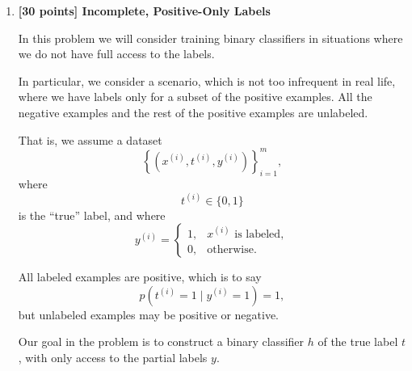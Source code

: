 \documentclass[10pt]{article}
\begin{document}
\begin{enumerate}
\begin{enumerate}[label=(\alph*)]
\item \textbf{[3 extra credit points]}

For the dataset where GDA performed worse in parts (f) and (g), can
you find a transformation of the $x^{(i)}$'s such that GDA performs
significantly better?

What is this transformation?

\medskip
\noindent\colorbox{yellow}{\textbf{Solution.}}

Box-Cox transformation: define 
\\
\[
\boxed{
T_\lambda(x)=
\begin{cases}
\displaystyle\frac{x^\lambda-1}{\lambda},
&\lambda\neq0,\\[10pt]
\log x,
&\lambda=0.
\end{cases}
}
\]

Note: we tempararily skip this part, and we'll come back later if we have more time

\end{enumerate}



\newpage 

\item \textbf{[30 points] Incomplete, Positive-Only Labels}

In this problem we will consider training binary classifiers in
situations where we do not have full access to the labels.

In particular, we consider a scenario, which is not too infrequent in
real life, where we have labels only for a subset of the positive
examples. All the negative examples and the rest of the positive
examples are unlabeled.

That is, we assume a dataset
\[
\left\{
(x^{(i)},t^{(i)},y^{(i)})
\right\}_{i=1}^{m},
\]
where
\[
t^{(i)}\in\{0,1\}
\]
is the ``true'' label, and where
\[
y^{(i)}
=
\begin{cases}
1, & x^{(i)}\text{ is labeled},\\
0, & \text{otherwise}.
\end{cases}
\]

All labeled examples are positive, which is to say
\[
p(t^{(i)}=1\mid y^{(i)}=1)=1,
\]
but unlabeled examples may be positive or negative.

Our goal in the problem is to construct a binary classifier $h$ of
the true label $t$, with only access to the partial labels $y$.


\end{enumerate}
\end{document}
